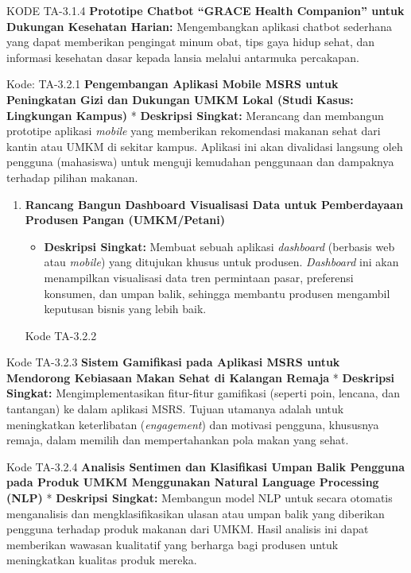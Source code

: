 \documentclass[
  letterpaper,
  DIV=11,
  numbers=noendperiod]{scrreprt}
\providecommand{\tightlist}{%
  \setlength{\itemsep}{0pt}\setlength{\parskip}{0pt}}
\begin{document}
KODE TA-3.1.4 \textbf{Prototipe Chatbot ``GRACE Health Companion'' untuk
Dukungan Kesehatan Harian:} Mengembangkan aplikasi chatbot sederhana
yang dapat memberikan pengingat minum obat, tips gaya hidup sehat, dan
informasi kesehatan dasar kepada lansia melalui antarmuka percakapan.

Kode: TA-3.2.1 \textbf{Pengembangan Aplikasi Mobile MSRS untuk
Peningkatan Gizi dan Dukungan UMKM Lokal (Studi Kasus: Lingkungan
Kampus)} * \textbf{Deskripsi Singkat:} Merancang dan membangun prototipe
aplikasi \emph{mobile} yang memberikan rekomendasi makanan sehat dari
kantin atau UMKM di sekitar kampus. Aplikasi ini akan divalidasi
langsung oleh pengguna (mahasiswa) untuk menguji kemudahan penggunaan
dan dampaknya terhadap pilihan makanan.

\begin{enumerate}
\def\labelenumi{\arabic{enumi}.}
\setcounter{enumi}{1}
\tightlist
\item
  \textbf{Rancang Bangun Dashboard Visualisasi Data untuk Pemberdayaan
  Produsen Pangan (UMKM/Petani)}

  \begin{itemize}
  \tightlist
  \item
    \textbf{Deskripsi Singkat:} Membuat sebuah aplikasi \emph{dashboard}
    (berbasis web atau \emph{mobile}) yang ditujukan khusus untuk
    produsen. \emph{Dashboard} ini akan menampilkan visualisasi data
    tren permintaan pasar, preferensi konsumen, dan umpan balik,
    sehingga membantu produsen mengambil keputusan bisnis yang lebih
    baik.
  \end{itemize}

  Kode TA-3.2.2
\end{enumerate}

Kode TA-3.2.3 \textbf{Sistem Gamifikasi pada Aplikasi MSRS untuk
Mendorong Kebiasaan Makan Sehat di Kalangan Remaja} * \textbf{Deskripsi
Singkat:} Mengimplementasikan fitur-fitur gamifikasi (seperti poin,
lencana, dan tantangan) ke dalam aplikasi MSRS. Tujuan utamanya adalah
untuk meningkatkan keterlibatan (\emph{engagement}) dan motivasi
pengguna, khususnya remaja, dalam memilih dan mempertahankan pola makan
yang sehat.

Kode TA-3.2.4 \textbf{Analisis Sentimen dan Klasifikasi Umpan Balik
Pengguna pada Produk UMKM Menggunakan Natural Language Processing (NLP)}
* \textbf{Deskripsi Singkat:} Membangun model NLP untuk secara otomatis
menganalisis dan mengklasifikasikan ulasan atau umpan balik yang
diberikan pengguna terhadap produk makanan dari UMKM. Hasil analisis ini
dapat memberikan wawasan kualitatif yang berharga bagi produsen untuk
meningkatkan kualitas produk mereka.
\end{document}
